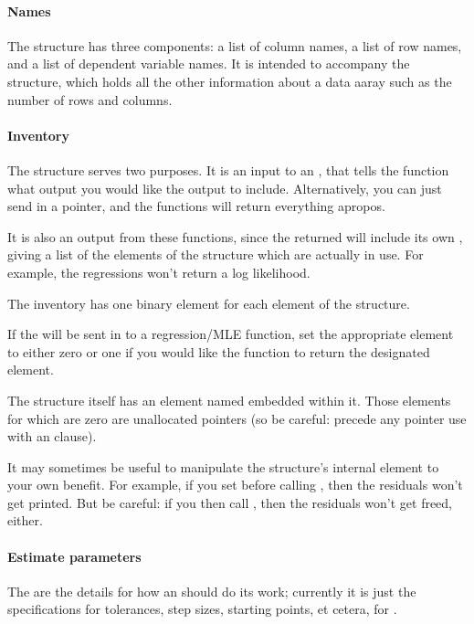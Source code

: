 \paragraph{Names}
The  structure has three components: a list of column
names, a list of row names, and a list of dependent variable names. It
is intended to accompany the  structure, which holds
all the other information about a data aaray such as the number of rows
and columns. 

\paragraph{Inventory}
The  structure serves two purposes. It is an input
to an , that tells the function what output you
would like the  output to include.  Alternatively, you
can just send in a  pointer, and the functions will return
everything apropos.

It is also an output from these functions, since the returned  will include its own ,
giving a list of the elements of the structure which are
actually in use. For example, the regressions won't return a log
likelihood.

The inventory has one binary element for each element of the  structure.

If the  will be sent in to a regression/MLE
function, set the appropriate element to either zero or one if you would
like the function to return the designated  element.

The  structure itself has an 
element named  embedded within it. Those elements for
which  are zero are unallocated pointers (so be careful:
precede any pointer use with an  clause).

It may sometimes be useful to manipulate the  structure's
internal  element to your own benefit. For
example, if you set  before calling
, then the residuals won't get
printed. But be careful: if you then call ,
then the residuals won't get freed, either.

\paragraph{Estimate parameters}
The  are the details for how an  should do its work; currently it is just the specifications
for tolerances, step sizes, starting points, et cetera, for .

